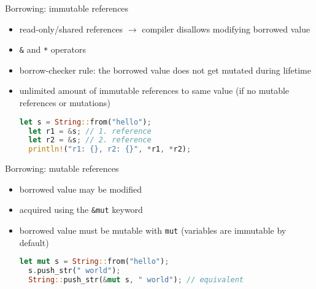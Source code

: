 \documentclass{beamer}
\begin{document}



\begin{frame}[fragile]{Borrowing: immutable references}
\begin{itemize}
  \item read-only/shared references $\rightarrow$ compiler disallows modifying borrowed value
  \item \verb|&| and \verb|*| operators
  \item borrow-checker rule: the borrowed value does not get mutated during lifetime
  \item unlimited amount of immutable references to same value (if no mutable references or mutations)

  \begin{lstlisting}[language=Rust]
  let s = String::from("hello");
  let r1 = &s; // 1. reference
  let r2 = &s; // 2. reference
  println!("r1: {}, r2: {}", *r1, *r2);
  \end{lstlisting}
\end{itemize}
\end{frame}


\begin{frame}[fragile]{Borrowing: mutable references}
\begin{itemize}
  \item borrowed value may be modified
  \item acquired using the \verb|&mut| keyword
  \item borrowed value must be mutable with \verb|mut| (variables are immutable by default)

  \begin{lstlisting}[language=Rust]
  let mut s = String::from("hello");
  s.push_str(" world");
  String::push_str(&mut s, " world"); // equivalent
  \end{lstlisting}
\end{itemize}
\end{frame}
\end{document}
